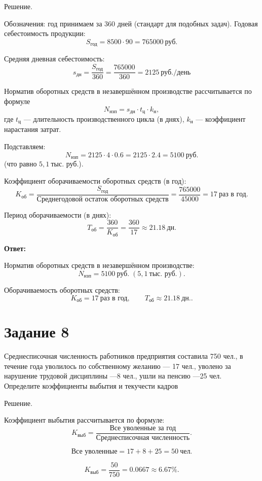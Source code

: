 \documentclass[14pt,a4paper]{extarticle}
\begin{document}
Решение.

Обозначения: год принимаем за $360$ дней (стандарт для подобных задач).
Годовая себестоимость продукции:
\[
S_{\text{год}} = 8500 \cdot 90 = 765000\ \text{руб.}
\]

Средняя дневная себестоимость:
\[
s_{\text{дн}} = \frac{S_{\text{год}}}{360} = \frac{765000}{360} = 2125\ \text{руб./день}
\]

Норматив оборотных средств в незавершённом производстве рассчитывается по формуле
\[
N_{\text{нзп}} = s_{\text{дн}} \cdot t_{\text{ц}} \cdot k_{\text{н}},
\]
где $t_{\text{ц}}$ --- длительность производственного цикла (в днях), $k_{\text{н}}$ --- коэффициент нарастания затрат.

Подставляем:
\[
N_{\text{нзп}} = 2125 \cdot 4 \cdot 0.6 = 2125 \cdot 2.4 = 5100\ \text{руб.}
\]
(что равно $5{,}1\ \text{тыс. руб.}$).

Коэффициент оборачиваемости оборотных средств (в год):
\[
K_{\text{об}} = \frac{S_{\text{год}}}{\text{Среднегодовой остаток оборотных средств}}
= \frac{765000}{45000} = 17\ \text{раз в год}.
\]

Период оборачиваемости (в днях):
\[
T_{\text{об}} = \frac{360}{K_{\text{об}}} = \frac{360}{17} \approx 21.18\ \text{дн.}
\]

\textbf{Ответ:}

Норматив оборотных средств в незавершённом производстве:
\[
N_{\text{нзп}} = 5100\ \text{руб.} \; (5{,}1\ \text{тыс. руб.}).
\]

Оборачиваемость оборотных средств:
\[
K_{\text{об}} = 17\ \text{раз в год}, \qquad T_{\text{об}} \approx 21.18\ \text{дн.}.
\]

\section{Задание 8}
Среднесписочная численность работников предприятия составила 750 чел., в
течение года уволилось по собственному желанию — 17 чел., уволено за нарушение
трудовой дисциплины —8 чел., ушли на пенсию —25 чел.
Определите коэффициенты выбытия и текучести кадров

Решение.

Коэффициент выбытия рассчитывается по формуле:
\[
K_{\text{выб}} = \frac{\text{Все уволенные за год}}{\text{Среднесписочная численность}}.
\]

\[
\text{Все уволенные} = 17 + 8 + 25 = 50\ \text{чел.}
\]

\[
K_{\text{выб}} = \frac{50}{750} = 0.0667 \approx 6.67\%.
\]
\end{document}
